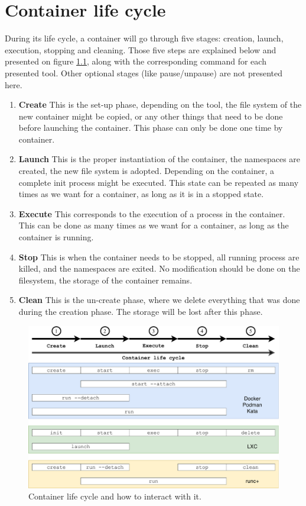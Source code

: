 \chapter{Container life cycle} \label{appendix:container-life-cycle}
During its life cycle, a container will go through five stages: creation, launch, execution, stopping and cleaning.  Those five steps are explained below and presented on figure \ref{fig:container-life-cycle}, along with the corresponding command for each presented tool.  Other optional stages (like pause/unpause) are not presented here.
\begin{enumerate}
\item\textbf{Create} This is the set-up phase, depending on the tool, the file system of the new container might be copied, or any other things that need to be done before launching the container.  This phase can only be done one time by container.
\item\textbf{Launch} This is the proper instantiation of the container, the namespaces are created, the new file system is adopted.  Depending on the container, a complete init process might be executed.  This state can be repeated as many times as we want for a container, as long as it is in a stopped state.
\item\textbf{Execute} This corresponds to the execution of a process in the container.  This can be done as many times as we want for a container, as long as the container is running.
\item\textbf{Stop} This is when the container needs to be stopped, all running process are killed, and the namespaces are exited.  No modification should be done on the filesystem, the storage of the container remains.
\item\textbf{Clean} This is the un-create phase, where we delete everything that was done during the creation phase.  The storage will be lost after this phase.
\end{enumerate}
\begin{figure}[!h]
  \begin{center}
    \includegraphics[width=\linewidth]{images/Container-life-cycle.pdf}
    \caption{Container life cycle and how to interact with it.}
    \label{fig:container-life-cycle}
  \end{center}
\end{figure}
